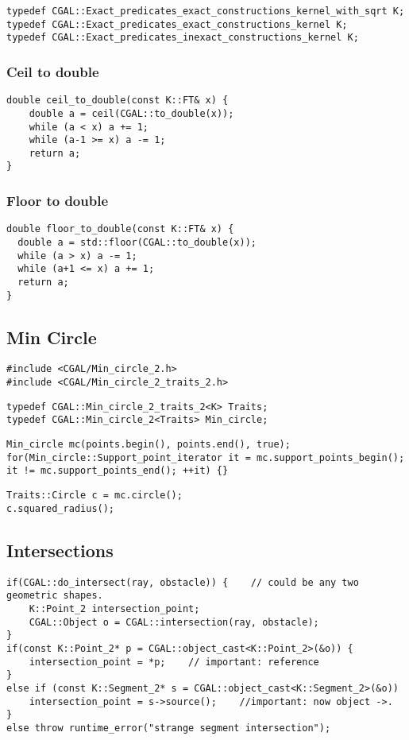 \documentclass[11pt]{article}
\begin{document}
\begin{lstlisting}
typedef CGAL::Exact_predicates_exact_constructions_kernel_with_sqrt K;
typedef CGAL::Exact_predicates_exact_constructions_kernel K;
typedef CGAL::Exact_predicates_inexact_constructions_kernel K;
\end{lstlisting}

\subsubsection{Ceil to double}
\begin{lstlisting}
double ceil_to_double(const K::FT& x) {
    double a = ceil(CGAL::to_double(x));
    while (a < x) a += 1;
    while (a-1 >= x) a -= 1;
    return a;
}
\end{lstlisting}

\subsubsection{Floor to double}
\begin{lstlisting}
double floor_to_double(const K::FT& x) {
  double a = std::floor(CGAL::to_double(x));
  while (a > x) a -= 1;
  while (a+1 <= x) a += 1;
  return a;
}
\end{lstlisting}

\subsection{Min Circle}
\begin{lstlisting}
#include <CGAL/Min_circle_2.h>
#include <CGAL/Min_circle_2_traits_2.h>
\end{lstlisting}

\begin{lstlisting}
typedef CGAL::Min_circle_2_traits_2<K> Traits;
typedef CGAL::Min_circle_2<Traits> Min_circle;
\end{lstlisting}

\begin{lstlisting}
Min_circle mc(points.begin(), points.end(), true);
for(Min_circle::Support_point_iterator it = mc.support_points_begin(); it != mc.support_points_end(); ++it) {}
\end{lstlisting}

\begin{lstlisting}
Traits::Circle c = mc.circle();
c.squared_radius();
\end{lstlisting}

\subsection{Intersections}
\begin{lstlisting}
if(CGAL::do_intersect(ray, obstacle)) {    // could be any two geometric shapes.
    K::Point_2 intersection_point;
	CGAL::Object o = CGAL::intersection(ray, obstacle);
}	
if(const K::Point_2* p = CGAL::object_cast<K::Point_2>(&o)) {
    intersection_point = *p;    // important: reference
}
else if (const K::Segment_2* s = CGAL::object_cast<K::Segment_2>(&o))
    intersection_point = s->source();    //important: now object ->.
}
else throw runtime_error("strange segment intersection");
\end{lstlisting}
\end{document}
